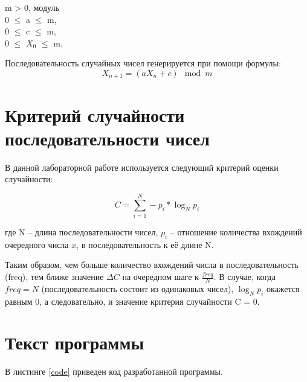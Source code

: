 \documentclass[12pt,a4paper,oneside]{report}
\begin{document}
	\begin{center}
		m > 0, модуль\\
		0 $\leq$ a	$\leq$ m, \\
		0 $\leq$ c $\leq$ m, \\
		0 $\leq$ $X_0$ $\leq$ m, \\
	\end{center}
	
	Последовательность случайных чисел генерируется при помощи формулы:
	\begin{equation}
		X_{n+1}=(aX_n+c)\mod m
	\end{equation}
	
	\section*{Критерий случайности последовательности чисел}
	\quad В данной лабораторной работе используется следующий критерий оценки случайности:
	
	\begin{equation}
		C = \sum_{i=1}^{N}  -p_{i}*{\log_N p_{i}}
	\end{equation}
	
	где N – длина последовательности чисел, $p_{i}$ – отношение количества вхождений очередного числа $x_{i}$ в последовательность к её длине N.
	
	Таким образом, чем больше количество вхождений числа в последовательность (freq), тем ближе значение $\Delta C$ на очередном шаге к $\frac{freq}{N}$. В случае, когда $freq = N$ (последовательность состоит из одинаковых чисел), ${\log_N p_{i}}$ окажется равным 0, а следовательно, и значение критерия случайности C = 0. 
	
	
	
	\section*{Текст программы}
	
	
	В листинге \ref{code} приведен код разработанной программы.
	
\end{document}
